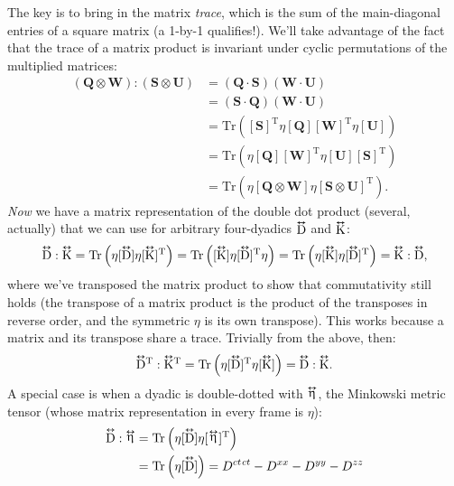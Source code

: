 \documentclass[12pt]{article}
\renewcommand{\vv}[1]{\mathbf{#1}}
\newcommand{\tightoverset}[2]{%
  \mathop{#2}\limits^{\vbox to -.5ex{\kern-0.75ex\hbox{$#1$}\vss}}}
\newcommand{\inlinedy}[1]{\tightoverset{\text{\tiny$\bm\leftrightarrow$}}{#1}}
\newcommand{\capdy}[1]{ \overset{ \text{\tiny$\bm\leftrightarrow$} }{\vphantom{\text{\small{A}}}\smash{#1}} }
\begin{document}
The key is to bring in the matrix \emph{trace}, which is the sum of the main-diagonal entries of a square matrix (a 1-by-1 qualifies!). We'll take advantage of the fact that the trace of a matrix product is invariant under cyclic permutations of the multiplied matrices:
\begin{equation*}
\begin{aligned}
(\vv Q \otimes \vv W) : (\vv S \otimes \vv U) &= (\vv Q \cdot \vv S) (\vv W \cdot \vv U) \\
&= (\vv S \cdot \vv Q) (\vv W \cdot \vv U) \\
&= \mathrm{Tr} \left( [\vv S]^{\mathrm{T}} \eta [\vv Q] [\vv W]^{\mathrm{T}} \eta [\vv U] \right) \\[2pt]
&= \mathrm{Tr} \left( \eta [\vv Q] [\vv W]^{\mathrm{T}} \eta [\vv U] [\vv S]^{\mathrm{T}} \right) \\[2pt]
&= \mathrm{Tr} \left( \eta [\vv Q \otimes \vv W] \eta [\vv S \otimes \vv U]^\mathrm{T} \right).
\end{aligned}
\end{equation*}
\emph{Now} we have a matrix representation of the double dot product (several, actually) that we can use for arbitrary four-dyadics $\inlinedy{\mathrm{D}}$ and $\inlinedy{\mathrm{K}}$:
\begin{equation*}
\capdy{\mathrm{D}} : \capdy{\mathrm{K}} = \mathrm{Tr} \left( \eta [\capdy{\mathrm{D}}] \eta [ \capdy{\mathrm{K}} ]^{\mathrm{T}} \right) = \mathrm{Tr} \left( [\capdy{\mathrm{K}}] \eta [ \capdy{\mathrm{D}} ]^{\mathrm{T}} \eta \right) = \mathrm{Tr} \left( \eta [\capdy{\mathrm{K}}] \eta [ \capdy{\mathrm{D}} ]^{\mathrm{T}} \right) = \capdy{\mathrm{K}} : \capdy{\mathrm{D}} ,
\end{equation*}
where we've transposed the matrix product to show that commutativity still holds (the transpose of a matrix product is the product of the transposes in reverse order, and the symmetric $\eta$ is its own transpose). This works because a matrix and its transpose share a trace. Trivially from the above, then:
\begin{equation*}
\capdy{\mathrm{D}} \mkern0mu ^\mathrm{T} : \capdy{\mathrm{K}} \mkern0mu ^\mathrm{T} = \mathrm{Tr} \left( \eta [\capdy{\mathrm{D}}]^{\mathrm{T}} \eta [ \capdy{\mathrm{K}} ] \right) = \capdy{\mathrm{D}} : \capdy{\mathrm{K}} .
\end{equation*}
A special case is when a dyadic is double-dotted with $\inlinedy{\upeta}$, the Minkowski metric tensor (whose matrix representation in every frame is $\eta$):
\begin{equation*}
\begin{split}
\capdy{\mathrm{D}} : \inlinedy{\upeta} &= \mathrm{Tr} \left( \eta [\capdy{\mathrm{D}}] \eta [ \mkern1mu \inlinedy{\upeta} \mkern.5mu ]^{\mathrm{T}} \right) \\
&= \mathrm{Tr} \left( \eta [\capdy{\mathrm{D}}] \right) = D^{ct \mkern1.5mu ct} - D^{xx} - D^{yy} - D^{zz}
\end{split}
\end{equation*}
\end{document}
